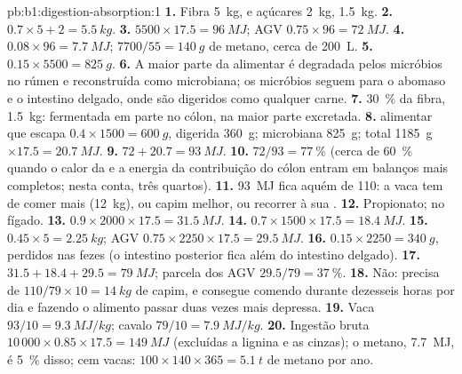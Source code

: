 \begin{solution}{pb:b1:digestion-absorption:1}
\textbf{1.} Fibra \qty{5}{kg},  e açúcares \qty{2}{kg}, 
\qty{1.5}{kg}.
\textbf{2.} $0.7\times 5 + 2 = \qty{5.5}{kg}$.
\textbf{3.} $5500\times 17.5 = \qty{96}{MJ}$; AGV $0.75\times 96 =
\qty{72}{MJ}$.
\textbf{4.} $0.08\times 96 = \qty{7.7}{MJ}$; $7700/55 = \qty{140}{g}$
de metano, cerca de \qty{200}{L}.
\textbf{5.} $0.15\times 5500 = \qty{825}{g}$.
\textbf{6.} A maior parte da  alimentar é degradada pelos
micróbios no rúmen e reconstruída como  microbiana; os
micróbios seguem para o abomaso e o intestino delgado, onde são
digeridos como qualquer carne.
\textbf{7.} \qty{30}{\%} da fibra, \qty{1.5}{kg}: fermentada em parte
no cólon, na maior parte excretada.
\textbf{8.}  alimentar que escapa $0.4\times 1500 = \qty{600}{g}$,
digerida \qty{360}{g}; microbiana \qty{825}{g}; total \qty{1185}{g}
$\times 17.5 = \qty{20.7}{MJ}$.
\textbf{9.} $72 + 20.7 = \qty{93}{MJ}$.
\textbf{10.} $72/93 = \qty{77}{\%}$ (cerca de \qty{60}{\%} quando o
calor da  e a energia da contribuição do cólon entram em
balanços mais completos; nesta conta, três quartos).
\textbf{11.} \qty{93}{MJ} fica aquém de \qty{110}{}: a vaca tem de
comer mais (\qty{12}{kg}), ou capim melhor, ou recorrer à sua .
\textbf{12.} Propionato;  no fígado.
\textbf{13.} $0.9\times 2000\times 17.5 = \qty{31.5}{MJ}$.
\textbf{14.} $0.7\times 1500\times 17.5 = \qty{18.4}{MJ}$.
\textbf{15.} $0.45\times 5 = \qty{2.25}{kg}$; AGV $0.75\times 2250\times
17.5 = \qty{29.5}{MJ}$.
\textbf{16.} $0.15\times 2250 = \qty{340}{g}$, perdidos nas fezes (o
intestino posterior fica além do intestino delgado).
\textbf{17.} $31.5 + 18.4 + 29.5 = \qty{79}{MJ}$; parcela dos AGV $29.5/79 =
\qty{37}{\%}$.
\textbf{18.} Não: precisa de $110/79\times 10 = \qty{14}{kg}$ de capim,
e consegue comendo durante dezesseis horas por dia e fazendo o
alimento passar duas vezes mais depressa.
\textbf{19.} Vaca $93/10 = \qty{9.3}{MJ/kg}$; cavalo $79/10 =
\qty{7.9}{MJ/kg}$.
\textbf{20.} Ingestão bruta $10\,000\times 0.85\times 17.5 =
\qty{149}{MJ}$ (excluídas a lignina e as cinzas); o metano,
\qty{7.7}{MJ}, é \qty{5}{\%} disso; cem vacas: $100\times 140\times 365 =
\qty{5.1}{t}$ de metano por ano.

\end{solution}
